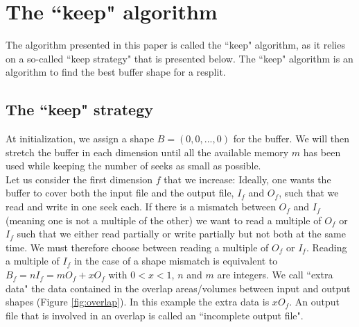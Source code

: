 \documentclass[conference]{IEEEtran}
\begin{document}
\section*{The ``keep" algorithm}
The algorithm presented in this paper is called the ``keep" algorithm, as it relies on a so-called ``keep strategy" that is presented below.
The ``keep" algorithm is an algorithm to find the best buffer shape for a resplit.

\subsection{The ``keep" strategy}
At initialization, we assign a shape $B = (0, 0,..., 0)$ for the buffer.
We will then stretch the buffer in each dimension until all the available memory $m$ has been used while keeping the number of seeks as small as possible. \\

Let us consider the first dimension $f$ that we increase: Ideally, one wants the buffer to cover both the input file and the output file, $I_f$ and $O_f$, such that we read and write in one seek each.
If there is a mismatch between $O_f$ and $I_f$ (meaning one is not a multiple of the other) we want to read a multiple of $O_f$ or $I_f$ such that we either read partially or write partially but not both at the same time.
We must therefore choose between reading a multiple of $O_f$ or $I_f$.
Reading a multiple of $I_f$ in the case of a shape mismatch is equivalent to $B_f = nI_f = mO_f+xO_f$ with $0<x<1$, $n$ and $m$ are integers.
We call ``extra data" the data contained in the overlap areas/volumes between input and output shapes (Figure \ref{fig:overlap}).
In this example the extra data is $xO_f$.
An output file that is involved in an overlap is called an ``incomplete output file". \\
\end{document}
